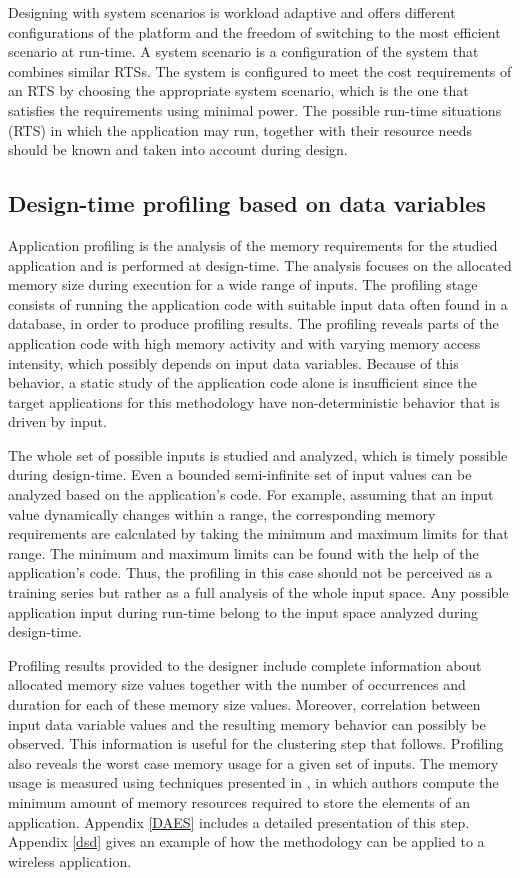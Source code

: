 Designing with system scenarios is workload adaptive and offers different configurations of the platform and the freedom of switching to the most efficient scenario at run-time. 
A system scenario is a configuration of the system that combines similar RTSs.
The system is configured to meet the cost requirements of an RTS by choosing the appropriate system scenario, which is the one that satisfies the requirements using minimal power.
The possible run-time situations (RTS)  in which the application may run, together with their resource needs should be known and taken into account during design.  

\subsection{Design-time profiling based on data variables}

Application profiling is the analysis of the memory requirements for the studied application and is performed at design-time.
The analysis focuses on the allocated memory size during execution  for a wide range of inputs. 
The profiling stage consists of running the application code with suitable input data often found in a database, in order to produce profiling results.  
The profiling reveals parts of the application code with high memory activity and with varying memory access intensity, which possibly depends on input data variables. 
Because of this behavior, a static study of the application code alone is insufficient since the target applications for this methodology have non-deterministic behavior that is driven by input.

The whole set of possible inputs is studied and analyzed, which is timely possible during design-time.
Even a bounded semi-infinite set of input values can be analyzed based on the application's code.
For example, assuming that an input value dynamically changes within a range, the corresponding memory requirements are calculated by taking the minimum and maximum limits for that range.
The minimum and maximum limits can be found with the help of the application's code.
Thus, the profiling in this case should not be perceived as a training series but rather as a full analysis of the whole input space.
Any possible application input during run-time belong to the input space analyzed during design-time.

Profiling results provided to the designer include complete information about allocated memory size values together with the number of occurrences and duration for each of these memory size values. 
Moreover, correlation between input data variable values and the resulting memory behavior can possibly be observed. 
This information is useful for the clustering step that follows. 
Profiling also reveals the worst case memory usage for a given set of inputs. 
The memory usage is measured using techniques presented in \cite{Ang13b}, in which authors compute the minimum amount of memory resources required to store the elements of an application. 
Appendix \ref{DAES} includes a detailed presentation of this step. Appendix \ref{dsd} gives an example of how the methodology can be applied to a wireless application.

